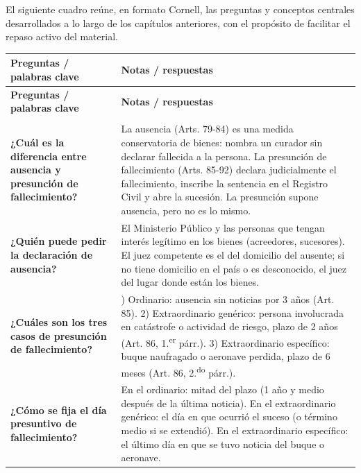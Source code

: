 \documentclass[12pt,oneside]{book}
\begin{document}
El siguiente cuadro reúne, en formato Cornell, las preguntas y conceptos
centrales desarrollados a lo largo de los capítulos anteriores, con el
propósito de facilitar el repaso activo del material.

\begin{longtable}{
    >{\raggedright\arraybackslash}p{}
    >{\raggedright\arraybackslash}p{}
}
\toprule
\textbf{Preguntas / palabras clave} & \textbf{Notas / respuestas} \\
\midrule
\endfirsthead

\toprule
\textbf{Preguntas / palabras clave} & \textbf{Notas / respuestas} \\
\midrule
\endhead

\midrule
\multicolumn{2}{r}{\textit{Continúa en la página siguiente}} \\
\endfoot

\bottomrule
\endlastfoot

\textbf{¿Cuál es la diferencia entre ausencia y presunción de fallecimiento?} &
La ausencia (Arts. 79-84) es una medida conservatoria de bienes: nombra
un curador sin declarar fallecida a la persona. La presunción de
fallecimiento (Arts. 85-92) declara judicialmente el fallecimiento,
inscribe la sentencia en el Registro Civil y abre la sucesión. La
presunción supone ausencia, pero no es lo mismo. \\

\textbf{¿Quién puede pedir la declaración de ausencia?} &
El Ministerio Público y las personas que tengan interés legítimo en los
bienes (acreedores, sucesores). El juez competente es el del domicilio
del ausente; si no tiene domicilio en el país o es desconocido, el juez
del lugar donde están los bienes. \\

\textbf{¿Cuáles son los tres casos de presunción de fallecimiento?} &
1) Ordinario: ausencia sin noticias por 3 años (Art. 85). 2)
Extraordinario genérico: persona involucrada en catástrofe o actividad de
riesgo, plazo de 2 años (Art. 86, 1.\textsuperscript{er} párr.). 3)
Extraordinario específico: buque naufragado o aeronave perdida, plazo de
6 meses (Art. 86, 2.\textsuperscript{do} párr.). \\

\textbf{¿Cómo se fija el día presuntivo de fallecimiento?} &
En el ordinario: mitad del plazo (1 año y medio después de la última
noticia). En el extraordinario genérico: el día en que ocurrió el suceso
(o término medio si se extendió). En el extraordinario específico: el
último día en que se tuvo noticia del buque o aeronave. \\


\end{longtable}
\end{document}

